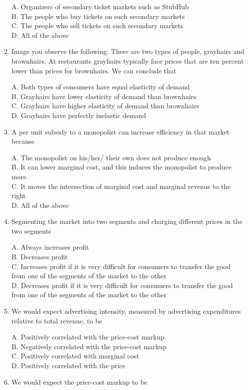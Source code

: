 \documentclass[
]{book}
\begin{document}
\begin{enumerate}
  A. Organizers of secondary ticket markets such as StubHub\\
  B. The people who buy tickets on such secondary markets\\
  C. The people who sell tickets on such secondary markets\\
  D. All of the above
\item
  Image you observe the following: There are two types of people, grayhairs and brownhairs. At restaurants grayhairs typically face prices that are ten percent lower than prices for brownhairs. We can conclude that

  A. Both types of consumers have equal elasticity of demand\\
  B. Grayhairs have lower elasticity of demand than brownhairs\\
  C. Grayhairs have higher elasticity of demand than brownhairs\\
  D. Grayhairs have perfectly inelastic demand
\item
  A per unit subsidy to a monopolist can increase efficiency in that market because

  A. The monopolist on his/her/ their own does not produce enough\\
  B. It can lower marginal cost, and this induces the monopolist to produce more\\
  C. It moves the intersection of marginal cost and marginal revenue to the right\\
  D. All of the above
\item
  Segmenting the market into two segments and charging different prices in the two segments

  A. Always increases profit\\
  B. Decreases profit\\
  C. Increases profit if it is very difficult for consumers to transfer the good from one of the segments of the market to the other\\
  D. Decreases profit if it is very difficult for consumers to transfer the good from one of the segments of the market to the other
\item
  We would expect advertising intensity, measured by advertising expenditures relative to total revenue, to be

  A. Positively correlated with the price-cost markup\\
  B. Negatively correlated with the price-cost markup\\
  C. Positively correlated with marginal cost\\
  D. Positively correlated with the price
\item
  We would expect the price-cost markup to be


\end{enumerate}
\end{document}
